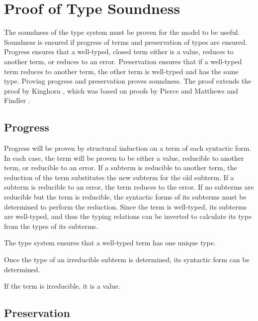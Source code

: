 \chapter{Proof of Type Soundness}

The soundness of the type system must be proven for the model to be useful.  Soundness is ensured if progress of terms and preservation of types are ensured.  Progress ensures that a well-typed, closed term either is a value, reduces to another term, or reduces to an error.  Preservation ensures that if a well-typed term reduces to another term, the other term is well-typed and has the same type.  Proving progress and preservation proves soundness.  The proof extends the proof by Kinghorn \cite{kinghorn07}, which was based on proofs by Pierce \cite{pierce02} and Matthews and Findler \cite{matthews07}.

\section{Progress}

Progress will be proven by structural induction on a term of each syntactic form.  In each case, the term will be proven to be either a value, reducible to another term, or reducible to an error.  If a subterm is reducible to another term, the reduction of the term substitutes the new subterm for the old subterm.  If a subterm is reducible to an error, the term reduces to the error.  If no subterms are reducible but the term is reducible, the syntactic forms of its subterms must be determined to perform the reduction.  Since the term is well-typed, its subterms are well-typed, and thus the typing relations can be inverted to calculate its type from the types of its subterms.



The type system ensures that a well-typed term has one unique type.



Once the type of an irreducible subterm is determined, its syntactic form can be determined.



If the term is irreducible, it is a value.



\section{Preservation}

